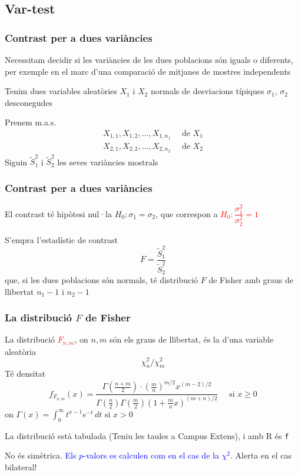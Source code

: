 \documentclass[12pt,t]{beamer}\usepackage[]{graphicx}\usepackage[]{color}
\newcommand{\red}[1]{\textcolor{red}{#1}}
\newcommand{\blue}[1]{\textcolor{blue}{#1}}
\renewcommand{\emph}[1]{{\color{red}#1}}
\renewcommand{\geq}{\geqslant}
\theoremstyle{plain}
\theoremstyle{definition}
\begin{document}
\subsection{Var-test}
\begin{frame}
\frametitle{Contrast per a dues variàncies}

Necessitam decidir si les variàncies de les dues poblacions són iguals o diferents, per exemple en el marc d'una comparació de mitjanes de mostres independents
\medskip


Tenim dues variables aleatòries $X_1$ i $X_2$ \emph{normals} de desviacions típiques $\sigma_1$, $\sigma_2$ desconegudes
\medskip

Prenem m.a.s. 
$$
\begin{array}{l}
X_{1,1}, X_{1,2},\ldots, X_{1,n_1}\quad\mbox{ de }X_1\\
X_{2,1}, X_{2,2},\ldots, X_{2,n_2}\quad\mbox{ de }X_2
\end{array}
$$
Siguin $\widetilde{S}_1^2$ i $\widetilde{S}_2^2$  les seves variàncies mostrals
\end{frame}


\begin{frame}
\frametitle{Contrast per a dues variàncies}


El contrast té hipòtesi nul·la $H_0: \sigma_1=\sigma_2$, que correspon a
\red{$H_0:\dfrac{\sigma^2_1}{\sigma_2^2}=1$}
\medskip

S'empra l'estadístic de contrast
$$
F=\frac{\widetilde{S}_1^2}{\widetilde{S}_2^2}
$$
que, si les dues poblacions són normals, té distribució \emph{$F$ de Fisher} amb graus de llibertat $n_1-1$ i $n_2-1$
\end{frame}

\begin{frame}
\frametitle{La distribució $F$ de Fisher}

La distribució \red{$F_{n,m}$}, on $n,m$ són els \emph{graus de llibertat},
és la  d'una variable aleatòria
$$
{\chi_{n}^2}/{\chi_m^2}
$$
Té densitat
$$
f_{F_{n,m}}(x)=\frac{\Gamma(\frac{n+m}{2})\cdot(\frac{m}{n})^{m/2}x^{(m-2)/2}}%
{\Gamma(\frac{n}{2})\Gamma(\frac{m}{2})(1+\frac{m}{n}x)^{(m+n)/2}}
\quad\mbox{ si $x\geq 0$}
$$
on $\Gamma(x)=\int_{0}^{\infty} t^{x-1}e^{-t}\, dt$ si $x> 0$
\bigskip


La distribució està tabulada (\emph{Teniu les taules a Campus Extens}), i amb R és \texttt{f} 
\medskip

No és simètrica. \blue{Els $p$-valors es calculen com en el cas de la $\chi^2$.} Alerta en el cas bilateral!

\end{frame}
\end{document}
